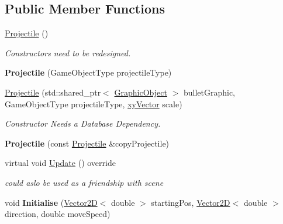 \subsection*{Public Member Functions}
\begin{DoxyCompactItemize}
\item 
\mbox{\label{class_projectile_ac536ed2aad56af866a2078b9a85aa16d}} 
\hyperlink{class_projectile_ac536ed2aad56af866a2078b9a85aa16d}{Projectile} ()
\begin{DoxyCompactList}\small\item\em Constructors need to be redesigned. \end{DoxyCompactList}\item 
\mbox{\label{class_projectile_a45f5e2eb6db9f673670e9de0aa9b9bab}} 
{\bfseries Projectile} (Game\+Object\+Type projectile\+Type)
\item 
\mbox{\label{class_projectile_a6d13e20ed5be714a7efd4be89791ea94}} 
\hyperlink{class_projectile_a6d13e20ed5be714a7efd4be89791ea94}{Projectile} (std\+::shared\+\_\+ptr$<$ \hyperlink{class_graphic_object}{Graphic\+Object} $>$ bullet\+Graphic, Game\+Object\+Type projectile\+Type, \hyperlink{structxy_vector}{xy\+Vector} scale)
\begin{DoxyCompactList}\small\item\em Constructor Needs a Database Dependency. \end{DoxyCompactList}\item 
\mbox{\label{class_projectile_a60b9863678645f9605bf938ef6df7938}} 
{\bfseries Projectile} (const \hyperlink{class_projectile}{Projectile} \&copy\+Projectile)
\item 
\mbox{\label{class_projectile_ad057a8aeadb0064aacd0f93b2d6de158}} 
virtual void \hyperlink{class_projectile_ad057a8aeadb0064aacd0f93b2d6de158}{Update} () override
\begin{DoxyCompactList}\small\item\em could aslo be used as a friendship with scene \end{DoxyCompactList}\item 
\mbox{\label{class_projectile_aedb2c1ee7933578088e4d2a60d9c0f5c}} 
void {\bfseries Initialise} (\hyperlink{class_vector2_d}{Vector2D}$<$ double $>$ starting\+Pos, \hyperlink{class_vector2_d}{Vector2D}$<$ double $>$ direction, double move\+Speed)

\end{DoxyCompactItemize}
